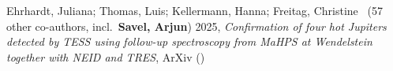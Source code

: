 \item[{\color{numcolor}\scriptsize1}] Ehrhardt, Juliana; Thomas, Luis; Kellermann, Hanna; Freitag, Christine \etal\ ({57} other co-authors, incl.\ \textbf{Savel, Arjun}) 2025, \emph{Confirmation of four hot Jupiters detected by TESS using follow-up spectroscopy from MaHPS at Wendelstein together with NEID and TRES}, ArXiv ()